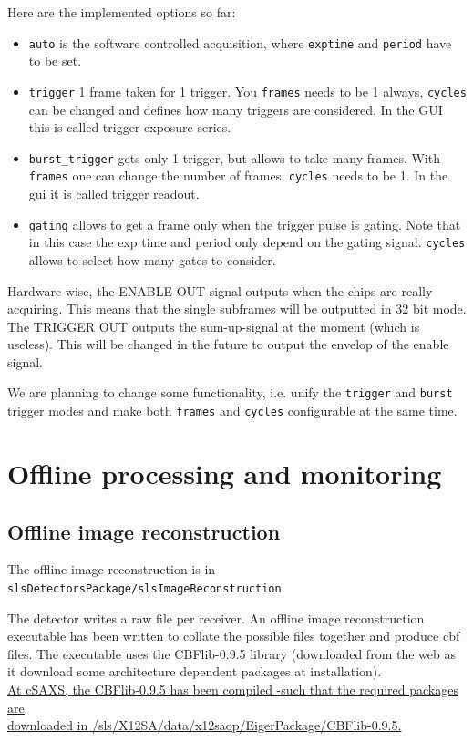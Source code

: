 \documentclass{article}
\begin{document}
Here are the implemented options so far:
\begin{itemize}
\item {\tt{auto}} is the software controlled acquisition, where {\tt{exptime}} and {\tt{period}} have to be set.
\item {\tt{trigger}} 1 frame taken for 1 trigger. You {\tt{frames}} needs to be  1 always, {\tt{cycles}} can be changed and defines how many triggers are considered. In the GUI this is called trigger exposure series. 
\item {\tt{burst\_trigger}} gets only 1 trigger, but allows to take many frames. With {\tt{frames}} one can change the number of frames. {\tt{cycles}} needs to be 1. In the gui it is called trigger readout.
\item{\tt{gating}} allows to get a frame only when the trigger pulse is gating. Note that in this case the exp time and period only depend on the gating signal. {\tt{cycles}} allows to select how many gates to consider. 
\end{itemize}

Hardware-wise, the ENABLE OUT signal outputs when the chips are really acquiring. This means that the single subframes will be outputted in 32 bit mode. The TRIGGER OUT outputs the sum-up-signal at the moment (which is useless). This will be changed in the future to output the envelop of the enable signal. 

We are planning to change some functionality, i.e. unify the {\tt{trigger}} and {\tt{burst}} trigger modes and make both {\tt{frames}} and {\tt{cycles}} configurable at the same time.

\section{Offline processing and monitoring}
\subsection{Offline image reconstruction}
The offline image reconstruction is in {\tt{slsDetectorsPackage/slsImageReconstruction}}.

The detector writes a raw file per receiver. An offline image reconstruction executable has been written to collate the possible files together and produce cbf files. The executable uses the CBFlib-0.9.5 library (downloaded from the web as it download some architecture dependent packages at installation).\\
\underline{At cSAXS, the CBFlib-0.9.5 has been compiled -such that the required packages are}\\\underline{ downloaded in /sls/X12SA/data/x12saop/EigerPackage/CBFlib-0.9.5.}\\ 
\end{document}
